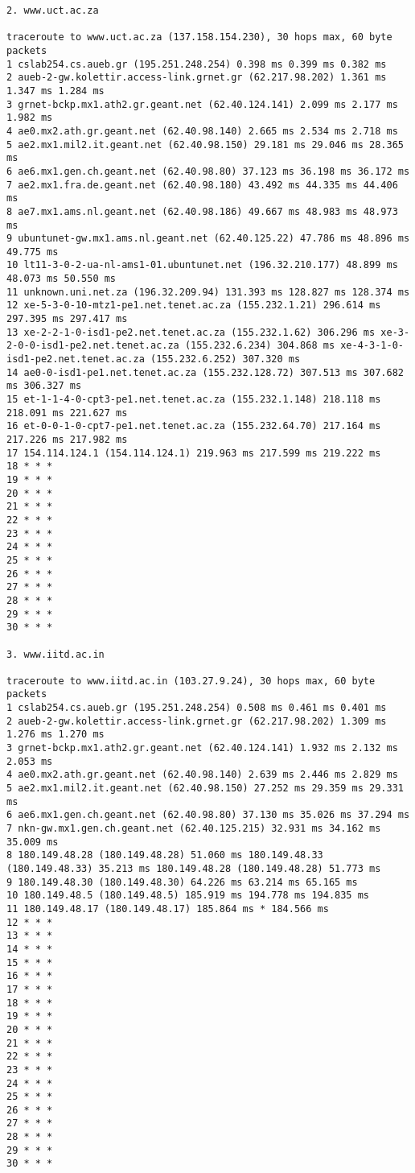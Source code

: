 \documentclass[a4paper]{article}
\begin{document}
\begin{enumerate}
\begin{lstlisting}
2. www.uct.ac.za

traceroute to www.uct.ac.za (137.158.154.230), 30 hops max, 60 byte packets
1 cslab254.cs.aueb.gr (195.251.248.254) 0.398 ms 0.399 ms 0.382 ms
2 aueb-2-gw.kolettir.access-link.grnet.gr (62.217.98.202) 1.361 ms 1.347 ms 1.284 ms
3 grnet-bckp.mx1.ath2.gr.geant.net (62.40.124.141) 2.099 ms 2.177 ms 1.982 ms
4 ae0.mx2.ath.gr.geant.net (62.40.98.140) 2.665 ms 2.534 ms 2.718 ms
5 ae2.mx1.mil2.it.geant.net (62.40.98.150) 29.181 ms 29.046 ms 28.365 ms
6 ae6.mx1.gen.ch.geant.net (62.40.98.80) 37.123 ms 36.198 ms 36.172 ms
7 ae2.mx1.fra.de.geant.net (62.40.98.180) 43.492 ms 44.335 ms 44.406 ms
8 ae7.mx1.ams.nl.geant.net (62.40.98.186) 49.667 ms 48.983 ms 48.973 ms
9 ubuntunet-gw.mx1.ams.nl.geant.net (62.40.125.22) 47.786 ms 48.896 ms 49.775 ms
10 lt11-3-0-2-ua-nl-ams1-01.ubuntunet.net (196.32.210.177) 48.899 ms 48.073 ms 50.550 ms
11 unknown.uni.net.za (196.32.209.94) 131.393 ms 128.827 ms 128.374 ms
12 xe-5-3-0-10-mtz1-pe1.net.tenet.ac.za (155.232.1.21) 296.614 ms 297.395 ms 297.417 ms
13 xe-2-2-1-0-isd1-pe2.net.tenet.ac.za (155.232.1.62) 306.296 ms xe-3-2-0-0-isd1-pe2.net.tenet.ac.za (155.232.6.234) 304.868 ms xe-4-3-1-0-isd1-pe2.net.tenet.ac.za (155.232.6.252) 307.320 ms
14 ae0-0-isd1-pe1.net.tenet.ac.za (155.232.128.72) 307.513 ms 307.682 ms 306.327 ms
15 et-1-1-4-0-cpt3-pe1.net.tenet.ac.za (155.232.1.148) 218.118 ms 218.091 ms 221.627 ms
16 et-0-0-1-0-cpt7-pe1.net.tenet.ac.za (155.232.64.70) 217.164 ms 217.226 ms 217.982 ms
17 154.114.124.1 (154.114.124.1) 219.963 ms 217.599 ms 219.222 ms
18 * * *
19 * * *
20 * * *
21 * * *
22 * * *
23 * * *
24 * * *
25 * * *
26 * * *
27 * * *
28 * * *
29 * * *
30 * * *

3. www.iitd.ac.in

traceroute to www.iitd.ac.in (103.27.9.24), 30 hops max, 60 byte packets
1 cslab254.cs.aueb.gr (195.251.248.254) 0.508 ms 0.461 ms 0.401 ms
2 aueb-2-gw.kolettir.access-link.grnet.gr (62.217.98.202) 1.309 ms 1.276 ms 1.270 ms
3 grnet-bckp.mx1.ath2.gr.geant.net (62.40.124.141) 1.932 ms 2.132 ms 2.053 ms
4 ae0.mx2.ath.gr.geant.net (62.40.98.140) 2.639 ms 2.446 ms 2.829 ms
5 ae2.mx1.mil2.it.geant.net (62.40.98.150) 27.252 ms 29.359 ms 29.331 ms
6 ae6.mx1.gen.ch.geant.net (62.40.98.80) 37.130 ms 35.026 ms 37.294 ms
7 nkn-gw.mx1.gen.ch.geant.net (62.40.125.215) 32.931 ms 34.162 ms 35.009 ms
8 180.149.48.28 (180.149.48.28) 51.060 ms 180.149.48.33 (180.149.48.33) 35.213 ms 180.149.48.28 (180.149.48.28) 51.773 ms
9 180.149.48.30 (180.149.48.30) 64.226 ms 63.214 ms 65.165 ms
10 180.149.48.5 (180.149.48.5) 185.919 ms 194.778 ms 194.835 ms
11 180.149.48.17 (180.149.48.17) 185.864 ms * 184.566 ms
12 * * *
13 * * *
14 * * *
15 * * *
16 * * *
17 * * *
18 * * *
19 * * *
20 * * *
21 * * *
22 * * *
23 * * *
24 * * *
25 * * *
26 * * *
27 * * *
28 * * *
29 * * *
30 * * *


\end{lstlisting}
\end{enumerate}
\end{document}

